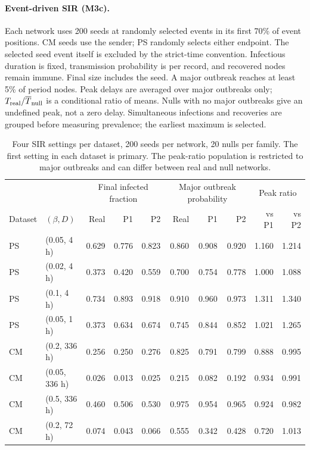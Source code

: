 \paragraph{Event-driven SIR (M3c).}\label{sec:d_sir}
Each network uses 200 seeds at randomly selected events in its first 70\% of event
positions. CM seeds use the sender; PS randomly selects either endpoint. The selected
seed event itself is excluded by the strict-time convention. Infectious duration is
fixed, transmission probability is per record, and recovered nodes remain immune.
Final size includes the seed. A major outbreak reaches at least 5\% of period nodes.
Peak delays are averaged over major outbreaks only; $T_{\rm real}/\overline T_{\rm null}$
is a conditional ratio of means. Nulls with no major outbreaks give an undefined peak,
not a zero delay. Simultaneous infections and recoveries are grouped before measuring
prevalence; the earliest maximum is selected.
\begin{table}[!htbp]\centering\small
\begin{tabular}{@{}llrrrrrrrr@{}}
\toprule & & \multicolumn{3}{c}{Final infected fraction} & \multicolumn{3}{c}{Major outbreak probability} & \multicolumn{2}{c}{Peak ratio} \\
Dataset & $(\beta,D)$ & Real & P1 & P2 & Real & P1 & P2 & vs P1 & vs P2 \\
\midrule
PS & (0.05, 4 h) & 0.629 & 0.776 & 0.823 & 0.860 & 0.908 & 0.920 & 1.160 & 1.214 \\
PS & (0.02, 4 h) & 0.373 & 0.420 & 0.559 & 0.700 & 0.754 & 0.778 & 1.000 & 1.088 \\
PS & (0.1, 4 h) & 0.734 & 0.893 & 0.918 & 0.910 & 0.960 & 0.973 & 1.311 & 1.340 \\
PS & (0.05, 1 h) & 0.373 & 0.634 & 0.674 & 0.745 & 0.844 & 0.852 & 1.021 & 1.265 \\
CM & (0.2, 336 h) & 0.256 & 0.250 & 0.276 & 0.825 & 0.791 & 0.799 & 0.888 & 0.995 \\
CM & (0.05, 336 h) & 0.026 & 0.013 & 0.025 & 0.215 & 0.082 & 0.192 & 0.934 & 0.991 \\
CM & (0.5, 336 h) & 0.460 & 0.506 & 0.530 & 0.975 & 0.954 & 0.965 & 0.924 & 0.982 \\
CM & (0.2, 72 h) & 0.074 & 0.043 & 0.066 & 0.555 & 0.342 & 0.428 & 0.720 & 1.013 \\
\bottomrule\end{tabular}
\caption{Four SIR settings per dataset, 200 seeds per network, 20 nulls per family.
The first setting in each dataset is primary. The peak-ratio population is restricted
to major outbreaks and can differ between real and null networks.}\label{tab:d-sir}
\end{table}
